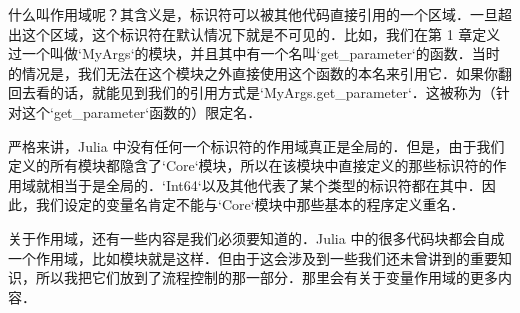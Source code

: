 什么叫作用域呢？其含义是，标识符可以被其他代码直接引用的一个区域．一旦超出这个区域，这个标识符在默认情况下就是不可见的．比如，我们在第 1 章定义过一个叫做`MyArgs`的模块，并且其中有一个名叫`get_parameter`的函数．当时的情况是，我们无法在这个模块之外直接使用这个函数的本名来引用它．如果你翻回去看的话，就能见到我们的引用方式是`MyArgs.get_parameter`．这被称为（针对这个`get_parameter`函数的）限定名．

严格来讲，Julia 中没有任何一个标识符的作用域真正是全局的．但是，由于我们定义的所有模块都隐含了`Core`模块，所以在该模块中直接定义的那些标识符的作用域就相当于是全局的．`Int64`以及其他代表了某个类型的标识符都在其中．因此，我们设定的变量名肯定不能与`Core`模块中那些基本的程序定义重名．

关于作用域，还有一些内容是我们必须要知道的．Julia 中的很多代码块都会自成一个作用域，比如模块就是这样．但由于这会涉及到一些我们还未曾讲到的重要知识，所以我把它们放到了流程控制的那一部分．那里会有关于变量作用域的更多内容．